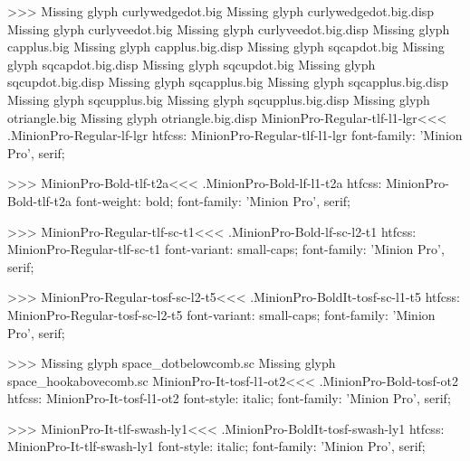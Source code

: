 {>>>
Missing glyph	curlywedgedot.big
Missing glyph	curlywedgedot.big.disp
Missing glyph	curlyveedot.big
Missing glyph	curlyveedot.big.disp
Missing glyph	capplus.big
Missing glyph	capplus.big.disp
Missing glyph	sqcapdot.big
Missing glyph	sqcapdot.big.disp
Missing glyph	sqcupdot.big
Missing glyph	sqcupdot.big.disp
Missing glyph	sqcapplus.big
Missing glyph	sqcapplus.big.disp
Missing glyph	sqcupplus.big
Missing glyph	sqcupplus.big.disp
Missing glyph	otriangle.big
Missing glyph	otriangle.big.disp
\<MinionPro-Regular-tlf-l1-lgr\><<<
.MinionPro-Regular-lf-lgr
htfcss:  MinionPro-Regular-tlf-l1-lgr  font-family: 'Minion Pro', serif;

>>>
\<MinionPro-Bold-tlf-t2a\><<<
.MinionPro-Bold-lf-l1-t2a
htfcss:  MinionPro-Bold-tlf-t2a  font-weight: bold; font-family: 'Minion Pro', serif;

>>>
\<MinionPro-Regular-tlf-sc-t1\><<<
.MinionPro-Bold-lf-sc-l2-t1
htfcss:  MinionPro-Regular-tlf-sc-t1  font-variant: small-caps; font-family: 'Minion Pro', serif;

>>>
\<MinionPro-Regular-tosf-sc-l2-t5\><<<
.MinionPro-BoldIt-tosf-sc-l1-t5
htfcss:  MinionPro-Regular-tosf-sc-l2-t5  font-variant: small-caps; font-family: 'Minion Pro', serif;

>>>
Missing glyph	space_dotbelowcomb.sc
Missing glyph	space_hookabovecomb.sc
\<MinionPro-It-tosf-l1-ot2\><<<
.MinionPro-Bold-tosf-ot2
htfcss:  MinionPro-It-tosf-l1-ot2  font-style: italic; font-family: 'Minion Pro', serif;

>>>
\<MinionPro-It-tlf-swash-ly1\><<<
.MinionPro-BoldIt-tosf-swash-ly1
htfcss:  MinionPro-It-tlf-swash-ly1  font-style: italic; font-family: 'Minion Pro', serif;

}
